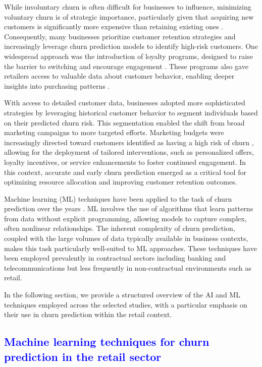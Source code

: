 \documentclass[preprint,12pt]{elsarticle}
\begin{document}
While involuntary churn is often difficult for businesses to influence, minimizing voluntary churn is of strategic importance, particularly given that acquiring new customers is significantly more expensive than retaining existing ones \cite{ahmad2001customer}. Consequently, many businesses prioritize customer retention strategies and increasingly leverage churn prediction models to identify high-risk customers. One widespread approach was the introduction of loyalty programs, designed to raise the barrier to switching and encourage engagement \cite{lewis2004influence}. These programs also gave retailers access to valuable data about customer behavior, enabling deeper insights into purchasing patterns \cite{stourm2020refocusing}.

With access to detailed customer data, businesses adopted more sophisticated strategies by leveraging historical customer behavior to segment individuals based on their predicted churn risk. This segmentation enabled the shift from broad marketing campaigns to more targeted efforts. Marketing budgets were increasingly directed toward customers identified as having a high risk of churn \cite{lemmens2020managing}, allowing for the deployment of tailored interventions, such as personalized offers, loyalty incentives, or service enhancements to foster continued engagement. In this context, accurate and early churn prediction emerged as a critical tool for optimizing resource allocation and improving customer retention outcomes.

Machine learning (ML) techniques have been applied to the task of churn prediction over the years \cite{churn-prediction-survery-manzoor-2024}. ML involves the use of algorithms that learn patterns from data without explicit programming, allowing models to capture complex, often nonlinear relationships. The inherent complexity of churn prediction, coupled with the large volumes of data typically available in business contexts, makes this task particularly well-suited to ML approaches. These techniques have been employed prevalently in contractual sectors including banking and telecommunications but less frequently in non-contractual environments such as retail.

In the following section, we provide a structured overview of the AI and ML techniques employed across the selected studies, with a particular emphasis on their use in churn prediction within the retail context. 

\subsection{\textcolor{blue}{Machine learning techniques for churn prediction in the retail sector}}
\end{document}
